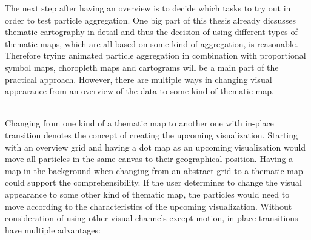 The next step after having an overview is to decide which tasks to try out in order to test particle aggregation. One big part of this thesis already dicsusses thematic cartography in detail and thus the decision of using different types of thematic maps, which are all based on some kind of aggregation, is reasonable. Therefore trying animated particle aggregation in combination with proportional symbol maps, choropleth maps and cartograms will be a main part of the practical approach. However, there are multiple ways in changing visual appearance from an overview of the data to some kind of thematic map.

\begin{enumerate}

 \hfill \\
Changing from one kind of a thematic map to another one with in-place transition denotes the concept of creating the upcoming visualization. Starting with an overview grid and having a dot map as an upcoming visualization would move all particles in the same canvas to their geographical position. Having a map in the background when changing from an abstract grid to a thematic map could support the comprehensibility.
If the user determines to change the visual appearance to some other kind of thematic map, the particles would need to move according to the characteristics of the upcoming visualization. Without consideration of using other visual channels except motion, in-place transitions have multiple advantages:



 \hfill \\


\end{enumerate}






